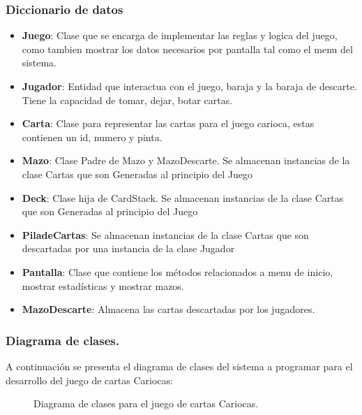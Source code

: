 

\subsubsection{Diccionario de datos}\label{cap:diccionario-datos}
\begin{itemize}
    \item\textbf{Juego}: Clase que se encarga de implementar las reglas y logica del juego, \\como tambien mostrar los datos necesarios por pantalla tal como el menu del sistema. 
    \item\textbf{Jugador}: Entidad que interactua con el juego, baraja y la baraja de descarte. Tiene la capacidad de tomar, dejar, botar cartas.
    \item\textbf{Carta}: Clase para representar las cartas para el juego carioca, estas contienen un id, numero y pinta.
    \item\textbf{Mazo}: Clase Padre de Mazo y MazoDescarte. Se almacenan instancias de la clase Cartas que son Generadas al principio del Juego
    \item\textbf{Deck}: Clase hija de CardStack. Se almacenan instancias de la clase Cartas que son Generadas al principio del Juego
    \item\textbf{PiladeCartas}: Se almacenan instancias de la clase Cartas que son descartadas por una instancia de la clase Jugador
    \item\textbf{Pantalla}: Clase que contiene los métodos relacionados a menu de inicio, mostrar estadísticas y mostrar mazos. 
    \item\textbf{MazoDescarte}: Almacena las cartas descartadas por los jugadores.
\end{itemize}
\clearpage
\subsubsection{Diagrama de clases.}\label{cap:diagrama-clases}
A continuación se presenta el diagrama de clases del sistema a programar para el desarrollo del juego de cartas Cariocas:
\begin{figure}[H]
    \centering
    \caption{Diagrama de clases para el juego de cartas Cariocas.}
\end{figure}

